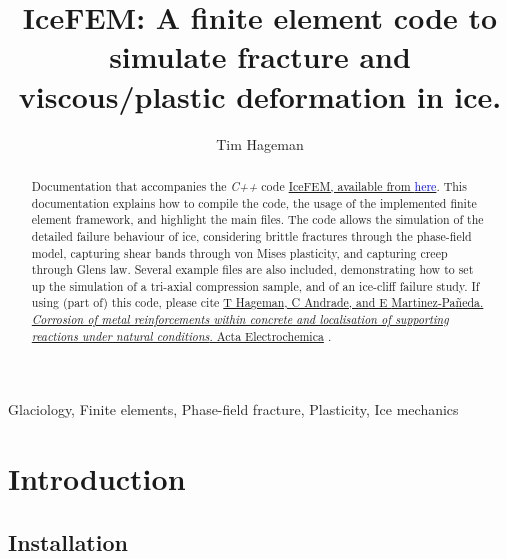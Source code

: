 \documentclass[3p]{elsarticle} %
\newcommand{\citeMe}{\href{https://doi.org/10.1016/j.electacta.2025.146203}{T Hageman, C Andrade, and E {Martinez-Pa{\~n}eda}. \textit{Corrosion of metal reinforcements within concrete and localisation of supporting reactions under natural conditions}. Acta Electrochemica} \citep{Hageman2025}}
\begin{document}
\begin{frontmatter}
\title{IceFEM: A finite element code to simulate fracture and viscous/plastic deformation in ice.}

\author{Tim Hageman }

\address{Department of Engineering Science, University of Oxford, Oxford OX1 3PJ, UK}

\begin{abstract}
Documentation that accompanies the \textit{C++} code \href{https://github.com/T-Hageman/Ice_FEM_2025a}{IceFEM, available from \textcolor{blue}{here}}. This documentation explains how to compile the code, the usage of the implemented finite element framework, and highlight the main files.  The code allows the simulation of the detailed failure behaviour of ice, considering brittle fractures through the phase-field model, capturing shear bands through von Mises plasticity, and capturing creep through Glens law. Several example files are also included, demonstrating how to set up the simulation of a tri-axial compression sample, and of an ice-cliff failure study. If using (part of) this code, please cite \citeMe{}.  
\end{abstract}

\begin{keyword}
Glaciology, Finite elements, Phase-field fracture, Plasticity, Ice mechanics
\end{keyword}

\end{frontmatter}


\newpage
\tableofcontents

\newpage
{}
\section{Introduction}




\subsection{Installation}
\end{document}
